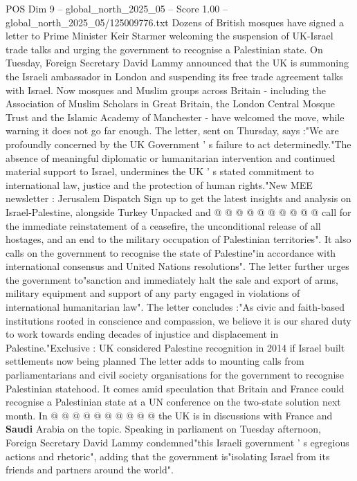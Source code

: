 \begin{textsample}{POS Dim 9 – global\_north\_2025\_05 – Score 1.00 – global\_north\_2025\_05/125009776.txt}  \label{ex:f9_pos_268}
Dozens of British mosques have signed a letter to Prime Minister Keir Starmer welcoming the suspension of UK-Israel trade talks and urging the government to recognise a Palestinian state.
On Tuesday, Foreign Secretary David Lammy announced that the UK is summoning the Israeli ambassador in London and suspending its free trade agreement talks with Israel.
Now mosques and Muslim groups across Britain - including the Association of Muslim Scholars in Great Britain, the London Central Mosque Trust and the Islamic Academy of Manchester - have welcomed the move, while warning it does not go far enough.
The letter, sent on Thursday, says :"We are profoundly concerned by the UK Government ' s failure to act determinedly."The absence of meaningful diplomatic or humanitarian intervention and continued material support to Israel, undermines the UK ' s stated commitment to international law, justice and the protection of human rights."New MEE newsletter : Jerusalem Dispatch Sign up to get the latest insights and analysis on Israel-Palestine, alongside Turkey Unpacked and @ @ @ @ @ @ @ @ @ @ call for the immediate reinstatement of a ceasefire, the unconditional release of all hostages, and an end to the military occupation of Palestinian territories".
It also calls on the government to recognise the state of Palestine"in accordance with international consensus and United Nations resolutions".
The letter further urges the government to"sanction and immediately halt the sale and export of arms, military equipment and support of any party engaged in violations of international humanitarian law".
The letter concludes :"As civic and faith-based institutions rooted in conscience and compassion, we believe it is our shared duty to work towards ending decades of injustice and displacement in Palestine."Exclusive : UK considered Palestine recognition in 2014 if Israel built settlements now being planned The letter adds to mounting calls from parliamentarians and civil society organisations for the government to recognise Palestinian statehood.
It comes amid speculation that Britain and France could recognise a Palestinian state at a UN conference on the two-state solution next month.
In @ @ @ @ @ @ @ @ @ @ the UK is in discussions with France and \textbf{Saudi} Arabia on the topic.
Speaking in parliament on Tuesday afternoon, Foreign Secretary David Lammy condemned"this Israeli government ' s egregious actions and rhetoric", adding that the government is"isolating Israel from its friends and partners around the world".

\end{textsample}
